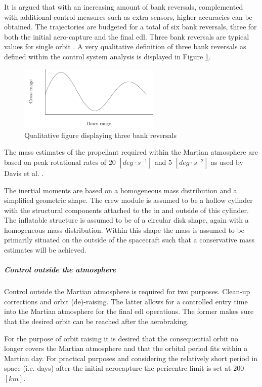 It is argued that with an increasing amount of bank reversals, complemented with additional control measures such as extra sensors, higher accuracies can be obtained. The trajectories are budgeted for a total of six bank reversals, three for both the initial aero-capture and the final \gls{edl}. Three bank reversals are typical values for single orbit \cite{Lu2007, Cianciolo2010}. A very qualitative definition of three bank reversals as defined within the control system analysis is displayed in Figure \ref{fig:bankdef}.

\begin{figure}[h]
	\centering
	\includegraphics[width=0.6\textwidth]{./Figure/control/Cont.pdf}
	\caption{Qualitative figure displaying three bank reversals}
	\label{fig:bankdef}
\end{figure}

The mass estimates of the propellant required within the Martian atmosphere are based on peak rotational rates of $20$ $[deg\cdot s^{-1}]$ and $5$ $[deg \cdot s^{-2}]$ as used by Davis et al. \cite{Davis2010}.

The inertial moments are based on a homogeneous mass distribution and a simplified geometric shape. The crew module is assumed to be a hollow cylinder with the structural components attached to the in and outside of this cylinder. The inflatable structure is assumed to be of a circular disk shape, again with a homogeneous mass distribution. Within this shape the mass is assumed to be primarily situated on the outside of the spacecraft such that a conservative mass estimates will be achieved.

\subparagraph{Control outside the atmosphere}
Control outside the Martian atmosphere is required for two purposes. Clean-up corrections and orbit (de)-raising. The latter allows for a controlled entry time into the Martian atmosphere for the final \gls{edl} operations. The former makes sure that the desired orbit can be reached after the aerobraking.

For the purpose of orbit raising it is desired that the consequential orbit no longer covers the Martian atmosphere and that the orbital period fits within a Martian day. For practical purposes and considering the relatively short period in space (i.e. days) after the initial aerocapture the pericentre limit is set at 200 $[km]$. 

